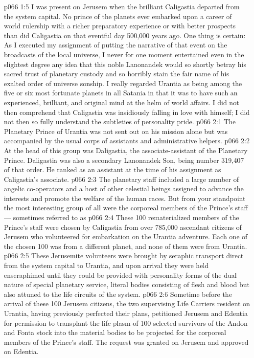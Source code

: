 \vs p066 1:5 I was present on Jerusem when the brilliant Caligastia departed from the system capital. No prince of the planets ever embarked upon a career of world rulership with a richer preparatory experience or with better prospects than did Caligastia on that eventful day 500,000 years ago. One thing is certain: As I executed my assignment of putting the narrative of that event on the broadcasts of the local universe, I never for one moment entertained even in the slightest degree any idea that this noble Lanonandek would so shortly betray his sacred trust of planetary custody and so horribly stain the fair name of his exalted order of universe sonship. I really regarded Urantia as being among the five or six most fortunate planets in all Satania in that it was to have such an experienced, brilliant, and original mind at the helm of world affairs. I did not then comprehend that Caligastia was insidiously falling in love with himself; I did not then so fully understand the subtleties of personality pride.
\vs p066 2:1 The Planetary Prince of Urantia was not sent out on his mission alone but was accompanied by the usual corps of assistants and administrative helpers.
\vs p066 2:2 At the head of this group was Daligastia, the associate\hyp{}assistant of the Planetary Prince. Daligastia was also a secondary Lanonandek Son, being number 319,407 of that order. He ranked as an assistant at the time of his assignment as Caligastia’s associate.
\vs p066 2:3 The planetary staff included a large number of angelic co\hyp{}operators and a host of other celestial beings assigned to advance the interests and promote the welfare of the human races. But from your standpoint the most interesting group of all were the corporeal members of the Prince’s staff --- sometimes referred to as 
\vs p066 2:4 \pc These 100 rematerialized members of the Prince’s staff were chosen by Caligastia from over 785,000 ascendant citizens of Jerusem who volunteered for embarkation on the Urantia adventure. Each one of the chosen 100 was from a different planet, and none of them were from Urantia.
\vs p066 2:5 These Jerusemite volunteers were brought by seraphic transport direct from the system capital to Urantia, and upon arrival they were held enseraphimed until they could be provided with personality forms of the dual nature of special planetary service, literal bodies consisting of flesh and blood but also attuned to the life circuits of the system.
\vs p066 2:6 \pc Sometime before the arrival of these 100 Jerusem citizens, the two supervising Life Carriers resident on Urantia, having previously perfected their plans, petitioned Jerusem and Edentia for permission to transplant the life plasm of 100 selected survivors of the Andon and Fonta stock into the material bodies to be projected for the corporeal members of the Prince’s staff. The request was granted on Jerusem and approved on Edentia.

